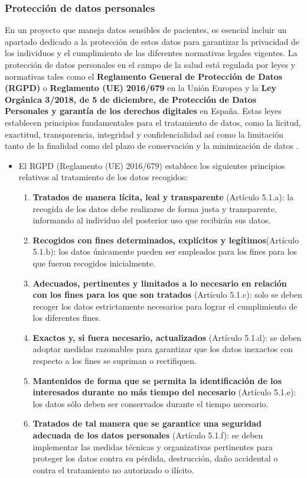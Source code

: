 \subsubsection{Protección de datos personales}
En un proyecto que maneja datos sensibles de pacientes, es esencial incluir un apartado dedicado a la protección de estos datos para garantizar la privacidad de los individuos y el cumplimiento de las diferentes normativas legales vigentes. La protección de datos personales en el campo de la salud  está regulada por leyes y normativas tales como el \textbf{Reglamento General de Protección de Datos (RGPD)} o \textbf{Reglamento (UE) 2016/679} en la Unión Europea y la \textbf{Ley Orgánica 3/2018, de 5 de diciembre, de Protección de Datos Personales y garantía de los derechos digitales} en España. Estas leyes establecen principios fundamentales para el tratamiento de datos, como la licitud, exactitud, transparencia, integridad y confidencialidad así como la limitación tanto de la finalidad como del plazo de conservación y la minimización de datos .
\begin{itemize}
    \item El RGPD (Reglamento (UE) 2016/679) \cite{reglaue} establece los siguientes principios relativos al tratamiento de los datos recogidos:
    \begin{enumerate}
        \item \textbf{Tratados de manera lícita, leal y transparente} (Artículo 5.1.a): la recogida de los datos debe realizarse de forma justa y transparente, informando al individuo del posterior uso que recibirán sus datos.
        \item \textbf{Recogidos con fines determinados, explícitos y legítimos}(Artículo 5.1.b): los datos únicamente pueden ser empleados para los fines para los que fueron recogidos inicialmente.
        \item \textbf{Adecuados, pertinentes y limitados a lo necesario en relación con los fines para los que son tratados} (Artículo 5.1.c): solo se deben recoger los datos estrictamente necesarios para lograr el cumplimiento de los diferentes fines.
        \item \textbf{Exactos y, si fuera necesario, actualizados} (Artículo 5.1.d): se deben adoptar medidas razonables para garantizar que los datos inexactos con respecto a los fines se supriman o rectifiquen.
        \item \textbf{Mantenidos de forma que se permita la identificación de los interesados durante no más tiempo del necesario} (Artículo 5.1.e): los datos sólo deben ser conservados durante el tiempo necesario.
        \item \textbf{Tratados de tal manera que se garantice una seguridad adecuada de los datos personales} (Artículo 5.1.f): se deben implementar las medidas técnicas y organizativas pertinentes para proteger los datos contra su pérdida, destrucción, daño accidental o contra el tratamiento no autorizado o ilícito.
    \end{enumerate}
\end{itemize}
